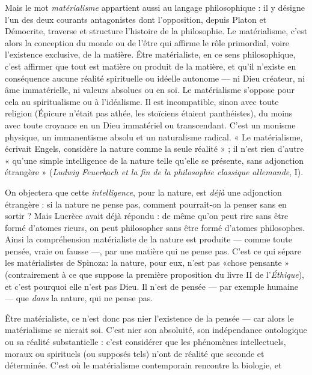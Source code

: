 Mais le mot {\it matérialisme} appartient aussi au langage philosophique : il y
désigne l’un des deux courants antagonistes dont l’opposition, depuis Platon et
Démocrite, traverse et structure l’histoire de la philosophie. Le matérialisme,
c’est alors la conception du monde ou de l’être qui affirme le rôle primordial,
voire l'existence exclusive, de la matière. Être matérialiste, en ce sens philosophique,
c’est affirmer que tout est matière ou produit de la matière, et qu’il
n'existe en conséquence aucune réalité spirituelle ou idéelle autonome — ni
Dieu créateur, ni âme immatérielle, ni valeurs absolues ou en soi. Le matérialisme
s'oppose pour cela au spiritualisme ou à l’idéalisme. Il est incompatible,
sinon avec toute religion (Épicure n’était pas athée, les stoïciens étaient panthéistes),
du moins avec toute croyance en un Dieu immatériel ou transcendant.
C’est un monisme physique, un immanentisme absolu et un naturalisme
radical. « Le matérialisme, écrivait Engels, considère la nature comme la seule
réalité » ; il n’est rien d’autre « qu’une simple intelligence de la nature telle
qu’elle se présente, sans adjonction étrangère » ({\it Ludwig Feuerbach et la fin de la
philosophie classique allemande}, I).

On objectera que cette {\it intelligence}, pour la nature, est {\it déjà} une adjonction
étrangère : si la nature ne pense pas, comment pourrait-on la penser sans en
sortir ? Mais Lucrèce avait déjà répondu : de même qu’on peut rire sans être
formé d’atomes rieurs, on peut philosopher sans être formé d’atomes philosophes.
Ainsi la compréhension matérialiste de la nature est produite — comme
toute pensée, vraie ou fausse —, par une matière qui ne pense pas. C’est ce qui
sépare les matérialistes de Spinoza: la nature, pour eux, n’est pas «chose
pensante » (contrairement à ce que suppose la première proposition du livre II
de l'{\it Éthique}), et c’est pourquoi elle n’est pas Dieu. Il n’est de pensée — par
exemple humaine — que {\it dans} la nature, qui ne pense pas.

Être matérialiste, ce n’est donc pas nier l’existence de la pensée — car alors
le matérialisme se nierait soi. C’est nier son absoluité, son indépendance ontologique
ou sa réalité substantielle : c’est considérer que les phénomènes intellectuels,
moraux ou spirituels (ou supposés tels) n’ont de réalité que seconde et
déterminée. C’est où le matérialisme contemporain rencontre la biologie, et

